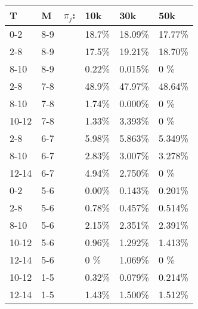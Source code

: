 \documentclass[12pt]{amsart}
\begin{document}
\begin{table}[h]
	\begin{center}
		\begin{tabular}{|l l ||l l| l| l|}
		T	& 	M & $\pi_j$: & 		10k & 		30k & 		50k	\\
		 \hline
		 0-2		&	8-9	&		&	18.7\%	&	 		18.09\%	&			17.77\%	\\                
		 2-8		&	8-9	&		&	17.5\%	&	 		19.21\%	&			18.70\%	\\                
		 8-10 	&	8-9	&		&	0.22\%	&	 		0.015\%	&			0		 \%	\\                
		 2-8		&	7-8	&		&	48.9\%	&	 		47.97\%	&			48.64\%	\\                
		 8-10 	&	7-8	&		&	1.74\%	&	 		0.000\%	&			0		 \%	\\                
		 10-12	&	7-8	&		&	1.33\%	&	 		3.393\%	&			0		 \%	\\                
		 2-8		&	6-7	&		&	5.98\%	&	 		5.863\%	&			5.349\%	\\                
		 8-10 	&	6-7	&		&	2.83\%	&	 		3.007\%	&			3.278\%	\\                
		 12-14	&	6-7	&		&	4.94\%	&	 		2.750\%	&			0		 \%	\\                
		 0-2		&	5-6	&		&	0.00\%	&	 		0.143\%	&			0.201\%	\\                
		 2-8		&	5-6	&		&	0.78\%	&	 		0.457\%	&			0.514\%	\\                
		 8-10 	&	5-6	&		&	2.15\%	&	 		2.351\%	&			2.391\%	\\                
		 10-12	&	5-6	&		&	0.96\%	&	 		1.292\%	&			1.413\%	\\                
		 12-14	&	5-6	&		&	0		\%	&	 		1.069\%	&			0		 \%	\\                
		 10-12	&	1-5	&		&	0.32\%	&	 		0.079\%	&			0.214\%	\\                
		 12-14	&	1-5	&		&	1.43\%	&	 		1.500\%	&			1.512\%	\\      
		\end{tabular}
	\end{center}
\end{table}


\newpage




\end{document}
